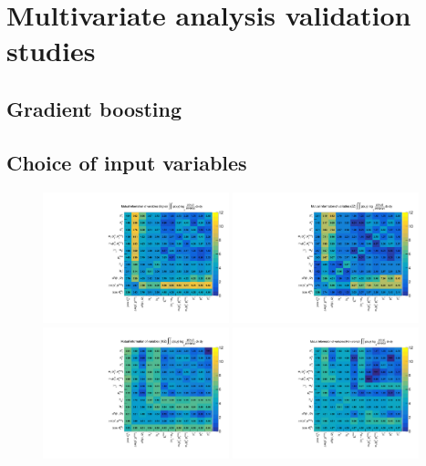 \chapter{Multivariate analysis validation studies}
\label{app:mva}

\section{Gradient boosting}

\section{Choice of input variables}

\begin{figure}[htbp]
\begin{center}
\includegraphics[width=0.48\textwidth]{figures/mutual_information_MVAvars_Signal.pdf}
\includegraphics[width=0.48\textwidth]{figures/mutual_information_MVAvars_ZZ.pdf}
\includegraphics[width=0.48\textwidth]{figures/mutual_information_MVAvars_WZ.pdf}
\includegraphics[width=0.48\textwidth]{figures/mutual_information_MVAvars_Non-prompt.pdf}

\end{center}
\end{figure}

